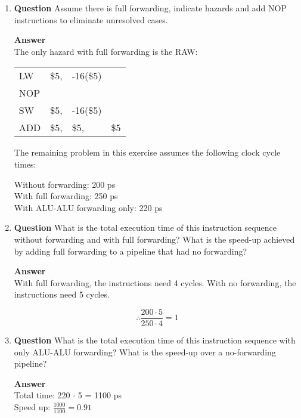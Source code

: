\documentclass[paper=usletter, fontsize=12pt]{article}
\begin{document}
\begin{enumerate}
\begin{enumerate}
            \item \textbf{Question}
            Assume there is full forwarding, indicate hazards and add NOP instructions to eliminate unresolved cases.

            \textbf{Answer} \\
            The only hazard with full forwarding is the RAW: \\


            \begin{table}[h]
                \centering
                \begin{tabular*}{100pt}{@{\extracolsep{\fill}} llll}
                LW & \$5, & -16(\$5) & \\
                NOP & & & \\
                SW & \$5, & -16(\$5) & \\
                ADD & \$5, & \$5, & \$5 \\
                \end{tabular*}
            \end{table}

            The remaining problem in this exercise assumes the following clock cycle times:

            Without forwarding: 200 ps \\
            With full forwarding: 250 ps \\
            With ALU-ALU forwarding only: 220 ps \\

            \item \textbf{Question}
            What is the total execution time of this instruction sequence without forwarding and with full forwarding? What is the speed-up achieved by adding full forwarding to a pipeline that had no forwarding?

            \textbf{Answer} \\
            With full forwarding, the instructions need 4 cycles. With no forwarding, the instructions need 5 cycles.

                \[ \therefore \frac{200\cdot5}{250\cdot4}=1 \]

            \item \textbf{Question}
            What is the total execution time of this instruction sequence with only ALU-ALU forwarding? What is the speed-up over a no-forwarding pipeline?

            \textbf{Answer} \\
            Total time: 220 $\cdot$ 5 = 1100 ps \\
            Speed up: $\frac{1000}{1100}=0.91$


\end{enumerate}
\end{enumerate}
\end{document}
